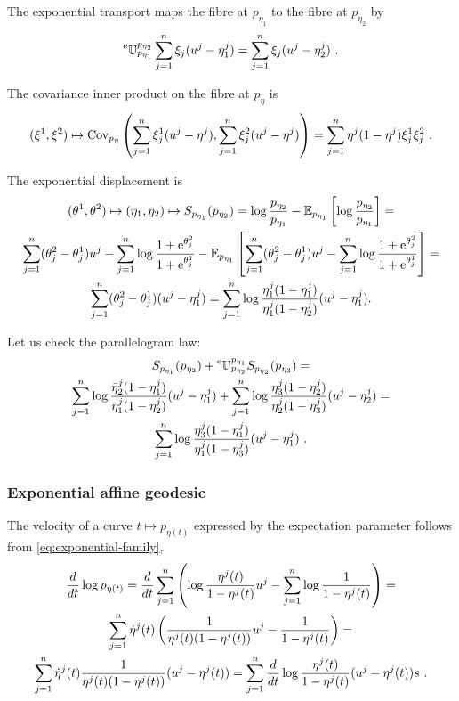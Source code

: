 \documentclass[12pt,a4paper]{amsart}
\begin{document}
The exponential transport maps the fibre at $p_{\eta_1}$ to the fibre at $p_{\eta_2}$ by
\begin{equation}
  \label{eq:49}
  \prescript{\text{e}}{} {\mathbb U} _ {p_{\eta_1}} ^ {p_{\eta_2}} \sum_{j=1}^n \xi_j(u^j - \eta^j_1) = \sum_{j=1}^n \xi_j(u^j - \eta^j_2) \ .
\end{equation}

The covariance inner product on the fibre at $p_\eta$ is
\begin{equation}
  \label{eq:29}
(\xi^1,\xi^2) \mapsto  \operatorname{Cov}_{p_\eta}\left(\sum_{j=1}^n \xi_j^1 (u^j - \eta^j),\sum_{j=1}^n  \xi_j^2(u^j-\eta^j)\right) = \sum_{j=1}^n \eta^j(1-\eta^j) \xi_j^1 \xi_j^2 \ .
\end{equation}

The exponential displacement is
\begin{multline}
  \label{eq:30}
  (\theta^1,\theta^2) \mapsto (\eta_1,\eta_2) \mapsto
  S_{p_{\eta_1}}(p_{\eta_2}) = \log \frac {p_{\eta_2}}{p_{\eta_1}} - \operatorname{\mathbb E}_{p_{\eta_1}}\left[\log \frac {p_{\eta_2}}{p_{\eta_1}}\right] = \\
  \sum_{j=1}^n (\theta^2_j - \theta_j^1) u^j - \sum_{j=1}^n \log \frac {1 + \mathrm{e}^{\theta_j^2}}{1 + \mathrm{e}^{\theta_j^1}} - \operatorname{\mathbb E}_{p_{\eta_1}}\left[ \sum_{j=1}^n (\theta_j^2 - \theta_j^1) u^j - \sum_{j=1}^n \log \frac {1 + \mathrm{e}^{\theta_j^2}}{1 + \mathrm{e}^{\theta_j^1}}\right] = \\
  \sum_{j=1}^n (\theta_j^2 - \theta_j^1)(u^j - \eta^j_1) = \sum_{j=1}^n \log \frac {\eta^j_1(1 - \eta^j_1)}{\eta^j_1 (1-\eta^j_2)} (u^j - \eta^j_1) .
\end{multline}

Let us check the parallelogram law:
\begin{multline}
  \label{eq:31}
  S_{p_{\eta_1}}(p_{\eta_2}) + \prescript{\text{e}}{} {\mathbb U} _ {p_{\eta_2}} ^ {p_{\eta_1}} S_{p_{\eta_2}}(p_{\eta_3}) = \\ 
  \sum_{j=1}^n \log \frac {\bar \eta^j_2(1 - \eta^j_1)}{\eta^j_1 (1- \eta^j_2)} (u^j - \eta^j_1) + \sum_{j=1}^n \log \frac {\eta_3^j(1 - \eta_2^j)}{\eta^j_2 (1- \eta_3^j)} (u^j - \eta^j_2) = \\
  \sum_{j=1}^n \log \frac {\eta^j_3(1 - \eta^j_1)}{\eta^j_1 (1- \eta_3^j)} (u^j - \eta^j_1) \ .
\end{multline}

\subsubsection{Exponential affine geodesic}
\label{sec:expon-affine-geod}
The velocity of a curve $t \mapsto p_{\eta(t)}$ expressed by the expectation parameter follows from \cref{eq:exponential-family},
\begin{multline}
  \label{eq:32}
 \frac{d}{dt} \log p_{\eta(t)} =  \frac{d}{dt} \sum_{j=1}^n \left(\log \frac{\eta^j(t)}{1-\eta^j(t)} u^j - \sum_{j=1}^n \log \frac 1 {1 - \eta^j(t)}\right) = \\
  \sum_{j=1}^n \dot \eta^j(t) \left(\frac 1 {\eta^j(t)(1 - \eta^j(t))}u^j - \frac 1 {1 - \eta^j(t)}\right) = \\
    \sum_{j=1}^n \dot \eta^j(t) \frac{1}{\eta^j(t)(1 - \eta^j(t))} (u^j - \eta^j(t)) = \sum_{j=1}^n \frac{d}{dt} \log \frac {\eta^j(t)}{1 - \eta^j(t)} (u^j - \eta^j(t))s \ .
\end{multline}
\end{document}

